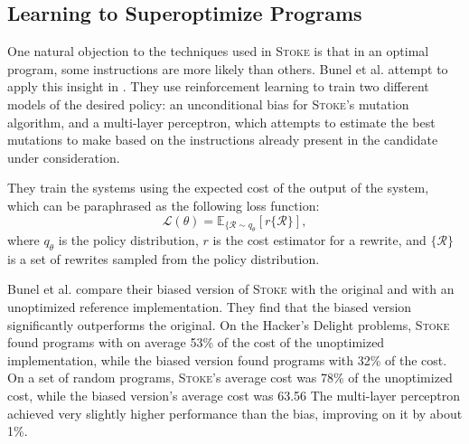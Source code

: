 \documentclass[12pt,twoside]{reedthesis}
\begin{document}

        \subsection{Learning to Superoptimize Programs}
            One natural objection to the techniques used in \textsc{Stoke} is that in an optimal program, some instructions are more likely than others.
            Bunel et al. attempt to apply this insight in \cite{bunel2017learning}.
            They use reinforcement learning to train two different models of the desired policy:
                an unconditional bias for \textsc{Stoke}'s mutation algorithm,
                and a multi-layer perceptron\footnotemark,
                    which attempts to estimate the best mutations to make based on the instructions already present in the candidate under consideration.
            
            They train the systems using the expected cost of the output of the system, which can be paraphrased as the following loss function:
            \[
                \mathcal{L}(\theta) = \mathbb{E}_{\{\mathcal{R}\sim q_\theta}[r\{\mathcal{R}\}],
            \]
            where $q_\theta$ is the policy distribution, $r$ is the cost estimator for a rewrite, and $\{\mathcal{R}\}$ is a set of rewrites sampled from the policy distribution.
            
            Bunel et al. compare their biased version of \textsc{Stoke} with the original and with an unoptimized reference implementation.
            They find that the biased version significantly outperforms the original.
            On the Hacker's Delight problems, \textsc{Stoke} found programs with on average 53\% of the cost of the unoptimized implementation, while the biased version found programs with 32\% of the cost.
            On a set of random programs, \textsc{Stoke}'s average cost was 78\% of the unoptimized cost, while the biased version's average cost was 63.56%
            The multi-layer perceptron achieved very slightly higher performance than the bias, improving on it by about 1\%.
\end{document}
